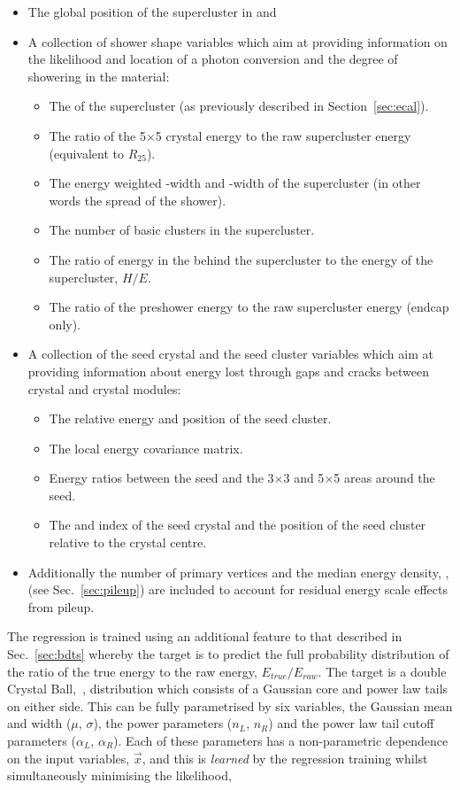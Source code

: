 \begin{itemize}
  \item The global position of the supercluster in \eta and \phi
  \item A collection of shower shape variables which aim at providing information on the likelihood and location of a photon conversion and the degree of showering in the material:
  \begin{itemize}
    \item The \rnine of the supercluster (as previously described in Section~\ref{sec:ecal}).
    \item The ratio of the 5$\times$5 crystal energy to the raw supercluster energy (equivalent to $R_{25}$).
    \item The energy weighted \eta-width and \phi-width of the supercluster (in other words the spread of the shower).
    \item The number of basic clusters in the supercluster.
    \item The ratio of energy in the \HCAL behind the supercluster to the \ECAL energy of the supercluster, $H/E$.
    \item The ratio of the preshower energy to the raw supercluster energy (endcap only).
  \end{itemize}
  \item A collection of the seed crystal and the seed cluster variables which aim at providing information about energy lost through gaps and cracks between crystal and crystal modules:
  \begin{itemize}
    \item The relative energy and position of the seed cluster.
    \item The local energy covariance matrix.
    \item Energy ratios between the seed and the 3$\times$3 and 5$\times$5 areas around the seed.
    \item The \eta and \phi index of the seed crystal and the position of the seed cluster relative to the crystal centre. 
  \end{itemize}
  \item Additionally the number of primary vertices and the median energy density, \rho, (see Sec.~\ref{sec:pileup}) are included to account for residual energy scale effects from pileup.
\end{itemize}
The regression is trained using an additional feature to that described in Sec.~\ref{sec:bdts} whereby the target is to predict the full probability distribution of the ratio of the true energy to the raw energy, $E_{true}/E_{raw}$. The target is a double Crystal Ball,~\cite{CrystalBallShape}, distribution which consists of a Gaussian core and power law tails on either side. This can be fully parametrised by six variables, the Gaussian mean and width ($\mu$, $\sigma$), the power parameters ($n_{L}$, $n_{R}$) and the power law tail cutoff parameters ($\alpha_{L}$, $\alpha_{R}$). Each of these parameters has a non-parametric dependence on the input variables, $\vec{x}$, and this is \emph{learned} by the regression training whilst simultaneously minimising the likelihood,
